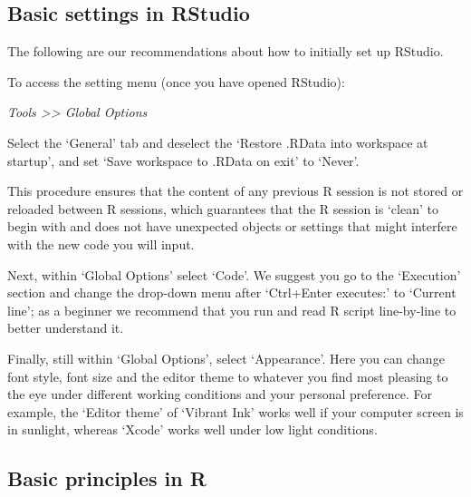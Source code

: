 \documentclass[
]{book}
\begin{document}
\hypertarget{RS-settings}{%
\subsection{Basic settings in RStudio}\label{RS-settings}}

The following are our recommendations about how to initially set up RStudio.

To access the setting menu (once you have opened RStudio):

\emph{Tools \textgreater\textgreater{} Global Options}

Select the `General' tab and deselect the `Restore .RData into workspace at startup', and set `Save workspace to .RData on exit' to `Never'.

This procedure ensures that the content of any previous R session is not stored or reloaded between R sessions, which guarantees that the R session is `clean' to begin with and does not have unexpected objects or settings that might interfere with the new code you will input.

Next, within `Global Options' select `Code'. We suggest you go to the `Execution' section and change the drop-down menu after `Ctrl+Enter executes:' to `Current line'; as a beginner we recommend that you run and read R script line-by-line to better understand it.

Finally, still within `Global Options', select `Appearance'. Here you can change font style, font size and the editor theme to whatever you find most pleasing to the eye under different working conditions and your personal preference. For example, the `Editor theme' of `Vibrant Ink' works well if your computer screen is in sunlight, whereas `Xcode' works well under low light conditions.

\hypertarget{Principles}{%
\subsection{Basic principles in R}\label{Principles}}
\end{document}
